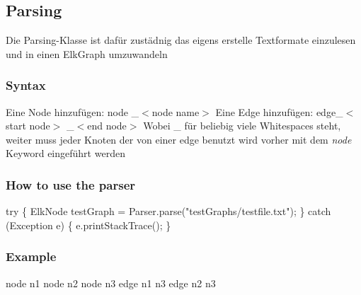 



\subsection*{Parsing}
Die Parsing-Klasse ist dafür zustädnig das eigens erstelle Textformate einzulesen
und in einen ElkGraph umzuwandeln

\subsubsection*{Syntax}
Eine Node hinzufügen:
\newline
\tab[0.5cm]  node \_$<$node name$>$
\newline
\newline
Eine Edge hinzufügen:\newline
\tab[0.5cm]  edge\_$<$start node$>$ \_$<$end node$>$
\newline
Wobei \_ für beliebig viele Whitespaces steht,
weiter muss jeder Knoten der von einer edge benutzt wird vorher mit dem \textit{node} Keyword eingeführt werden

\subsubsection*{How to use the parser}
try 
\{\newline
ElkNode testGraph = Parser.parse("testGraphs/testfile.txt");
\newline
\}
\newline
catch (Exception e)
\newline
\{
\newline
  e.printStackTrace(); 
\newline
\}


\subsubsection*{Example}
node n1 \newline
node n2 \newline
node n3 \newline
\newline
\newline
edge n1 n3\newline 
edge n2 n3 \newline









